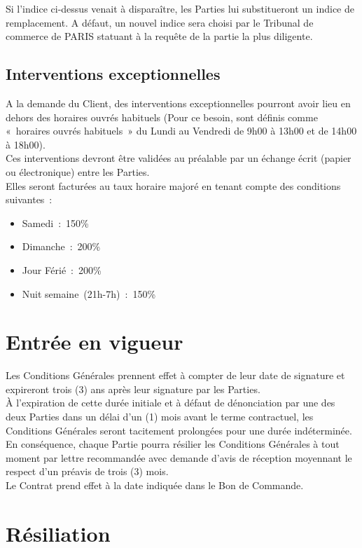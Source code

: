 \documentclass[9pt,french]{base}
\begin{document}
\begin{multicols*}{3}
Si l'indice ci-dessus venait à disparaître, les Parties lui substitueront
un indice de remplacement. A défaut, un nouvel indice sera choisi par le Tribunal de commerce de PARIS statuant à la requête de la partie la plus diligente.

\subsection{Interventions exceptionnelles}

A la demande du Client, des interventions exceptionnelles pourront
avoir lieu en dehors des horaires ouvrés habituels (Pour ce besoin, sont définis comme «~horaires ouvrés habituels~» du Lundi au Vendredi de
9h00 à 13h00 et de 14h00 à 18h00). \\
Ces interventions devront être validées au préalable par un échange écrit (papier ou électronique) entre les Parties. \\

Elles seront facturées au taux horaire majoré en tenant compte des conditions suivantes~:
\begin{itemize}
  \item Samedi~:~150\%
  \item Dimanche~:~200\%
  \item Jour Férié~:~200\%
  \item Nuit semaine~(21h-7h)~:~150\%
\end{itemize}

\section{Entrée en vigueur}

Les Conditions Générales prennent effet à compter de leur date de signature et expireront trois (3) ans après leur signature par les Parties. \\
À l’expiration de cette durée initiale et à défaut de dénonciation par une des deux Parties dans un délai d’un (1) mois avant le terme contractuel, les Conditions Générales seront tacitement prolongées pour une durée indéterminée. En conséquence, chaque Partie pourra résilier les Conditions Générales à tout moment par lettre recommandée avec demande d’avis de réception moyennant le respect d’un préavis de trois (3) mois. \\
Le Contrat prend effet à la date indiquée dans le Bon de Commande.

\section{Résiliation}


\end{multicols*}
\end{document}
